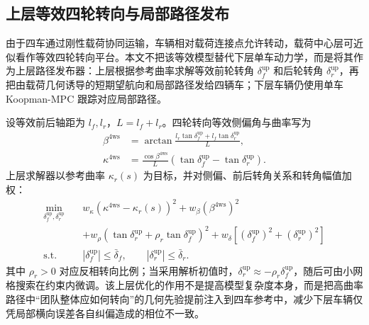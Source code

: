 \documentclass[twocolumn,3p,times,procedia]{elsarticle}
\begin{document}
\subsection{上层等效四轮转向与局部路径发布}

由于四车通过刚性载荷协同运输，车辆相对载荷连接点允许转动，载荷中心层可近似看作等效四轮转向平台。本文不把该等效模型替代下层单车动力学，而是将其作为上层路径发布器：上层根据参考曲率求解等效前轮转角 $\delta_f^{\mathrm{up}}$ 和后轮转角 $\delta_r^{\mathrm{up}}$，再把由载荷几何诱导的短期望航向和局部路径发给四辆车；下层车辆仍使用单车 Koopman-MPC 跟踪对应局部路径。

设等效前后轴距为 $l_f,l_r$，$L=l_f+l_r$。四轮转向等效侧偏角与曲率写为
\begin{equation}
\begin{aligned}
\beta^{\mathrm{4ws}} &=
\arctan\frac{l_r\tan\delta_f^{\mathrm{up}}+l_f\tan\delta_r^{\mathrm{up}}}{L},\\
\kappa^{\mathrm{4ws}} &=
\frac{\cos\beta^{\mathrm{4ws}}}{L}
\left(\tan\delta_f^{\mathrm{up}}-\tan\delta_r^{\mathrm{up}}\right).
\end{aligned}
\label{eq:fourws_beta_curvature}
\end{equation}
上层求解器以参考曲率 $\kappa_r(s)$ 为目标，并对侧偏、前后转角关系和转角幅值加权：
\begin{equation}
\begin{aligned}
\min_{\delta_f^{\mathrm{up}},\delta_r^{\mathrm{up}}}\quad
&w_\kappa\left(\kappa^{\mathrm{4ws}}-\kappa_r(s)\right)^2
+w_\beta\left(\beta^{\mathrm{4ws}}\right)^2\\
&+w_\rho\left(\tan\delta_r^{\mathrm{up}}+\rho_r\tan\delta_f^{\mathrm{up}}\right)^2
+w_\delta\left[\left(\delta_f^{\mathrm{up}}\right)^2+\left(\delta_r^{\mathrm{up}}\right)^2\right]\\
\mathrm{s.t.}\quad
&|\delta_f^{\mathrm{up}}|\le \bar\delta_f,\qquad
|\delta_r^{\mathrm{up}}|\le \bar\delta_r .
\end{aligned}
\label{eq:fourws_upper_opt}
\end{equation}
其中 $\rho_r>0$ 对应反相转向比例；当采用解析初值时，$\delta_r^{\mathrm{up}}\approx-\rho_r\delta_f^{\mathrm{up}}$，随后可由小网格搜索在约束内微调。该上层优化的作用不是提高模型复杂度本身，而是把高曲率路径中“团队整体应如何转向”的几何先验提前注入到四车参考中，减少下层车辆仅凭局部横向误差各自纠偏造成的相位不一致。
\end{document}
